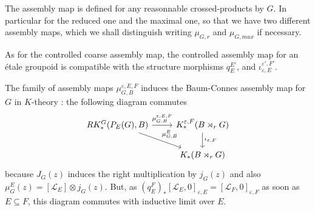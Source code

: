 
\begin{rk}
The assembly map is defined for any reasonnable crossed-products by $G$. In particular for the reduced one and the maximal one, so that we have two different assembly maps, which we shall distinguish writing $\mu_{G,r}$ and $\mu_{G,max}$ if necessary.
\end{rk}

\begin{rk} As for the controlled coarse assembly map, the controlled assembly map for an étale groupoid is compatible with the structure morphisms $q_{E}^{E'}$, and $\iota_{\varepsilon,E}^{\varepsilon',F'}$.
\end{rk}

\begin{rk} 
The family of assembly maps $\mu_{G,B}^{\varepsilon,E,F}$ induces the Baum-Connes assembly map for $G$ in $K$-theory : the following diagram commutes
\[\begin{tikzcd}
RK_*^G(P_E(G),B) \arrow{r}{\mu_{G,B}^{\varepsilon,E,F}}\arrow{dr}{\mu_{G,B}^E} & K_*^{\varepsilon, F}(B\rtimes_r G)\arrow{d}{\iota_{\varepsilon,F}}\\ 
		&  K_*(B\rtimes_r G)
\end{tikzcd}\]
because $J_G(z)$ induces the right multiplication by $j_G(z)$ and also $\mu_G^E(z)=[\mathcal L_E]\otimes j_G(z)$. But, as $(q_E^F)_*[\mathcal L_E,0]_{\varepsilon,E} = [\mathcal L_F,0]_{\varepsilon,F}$ as soon as $E\subseteq F$, this diagram commutes with inductive limit over $E$.\\
\end{rk}


